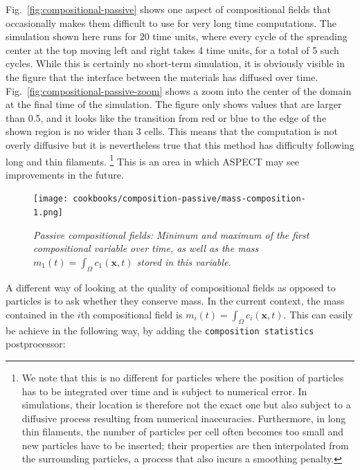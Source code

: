 \documentclass{article}
\newcommand{\aspect}{\textsc{ASPECT}}
\begin{document}
Fig.~\ref{fig:compositional-passive} shows one aspect of compositional
fields that occasionally makes them difficult to use for very long
time computations. The simulation shown here runs for 20 time units,
where every cycle of the spreading center at the top moving left and
right takes 4 time units, for a total of 5 such cycles. While this is
certainly no short-term simulation, it is obviously visible in the
figure that the interface between the materials has diffused over
time. Fig.~\ref{fig:compositional-passive-zoom} shows a zoom into the
center of the domain at the final time of the simulation. The
figure only shows values that are larger than 0.5, and it looks like
the transition from red or blue to the edge of the shown region is no
wider than 3 cells. This means that the computation is not overly
diffusive but it is nevertheless true that this method has difficulty
following long and thin filaments.%
\footnote{We note that this is no different for particles where the
  position of particles has to be integrated over time and is subject to
  numerical error. In simulations, their location is therefore not the
  exact one but also subject to a diffusive process resulting from
  numerical inaccuracies. Furthermore, in long thin filaments, the
  number of particles per cell often becomes too small and new particles
  have to be inserted; their properties are then interpolated from the
  surrounding particles, a process that also incurs a smoothing penalty.}
This is an area in which \aspect{} may see improvements in the future.


\begin{figure}
  \centering
  \texttt{[image: cookbooks/composition-passive/mass-composition-1.png]}
  \caption{\it Passive compositional fields: Minimum and maximum of the first
  compositional variable over time, as well as the mass $m_1(t)=\int_\Omega c_1(\mathbf x,t)$ stored in this variable.}
  \label{fig:compositional-passive-mass}
\end{figure}

A different way of looking at the quality of compositional fields as opposed to
particles is to ask whether they conserve mass. In the current context, the
mass contained in the $i$th compositional field is $m_i(t)=\int_\Omega c_i(\mathbf x,t)$.
This can easily be achieve in the following way, by adding the \texttt{composition statistics}
postprocessor:


\end{document}
